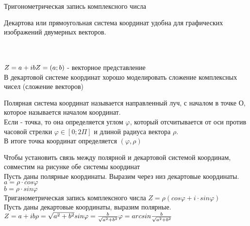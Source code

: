 \begin{title}
	Тригонометрическая запись комплексного числа
\end{title}

Декартова или прямоугольная система координат удобна для
графических изображений двумерных векторов. \\
 \\
 \\


$Z = a + ib \\
Z = (a; b)$ - векторное представление \\
В декартовой системе координат хорошо моделировать сложение
комплексных чисел (сложение векторов) \\

\begin{defin}
	Полярная система координат называется направленный луч, с
	началом в точке \kv
	{О}, которое называется началом координат. \\
	Если  - точка, то она определяется углом $\varphi$,
	который отсчитывается от оси против часовой стрелки $\varphi \in [0;
	2 \Pi]$ и длиной
	радиуса вектора $\rho$. \\
	В итоге точка координат определяется $(\varphi, \rho)$
\end{defin}

Чтобы установить связь между полярной и декартовой системой
координам, совместим на рисунке обе системы координат \\

Пусть даны полярные координаты. Выразим через низ декартовые
координаты. \\
$a = \rho \cdot cos\varphi$ \\
$b = \rho \cdot sin\varphi$ \\
Триганометрическая запись комплексного числа
$Z = \rho (cos\varphi + i \cdot sin \varphi)$ \\
Пусть даны декартовые координаты, выразим полярные. \\
$Z = a + ib \\
\rho = \sqrt{a^2 + b^2} \\
sin \varphi = \frac {b}{\sqrt{a^2 + b^2}} \\
\varphi = arcsin \frac {b}{\sqrt{a^2 + b^2}}$ \\

